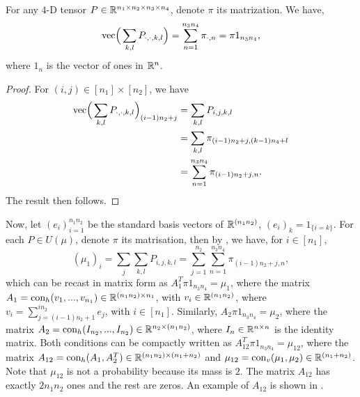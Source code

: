 \begin{lemma} \label{vec_mat}
  For any $4$-D tensor $P \in \mathbb R^{n_1 \times n_2 \times n_3 \times n_4}$,
  denote $\pi$ its matrization. We have,
  \begin{equation*}
    \text{vec} \Big( \sum_{k,l} P_{\cdot, \cdot, k, l} \Big) = \sum_{n=1}^{n_3 n_4} \pi_{\cdot, n} = \pi 1_{n_3 n_4},
  \end{equation*}
  where $1_n$ is the vector of ones in $\mathbb R^n$.
\end{lemma}
\begin{proof}
For $(i,j) \in [n_1] \times [n_2]$, we have
\begin{align*}
    \text{vec} \Big(\sum_{k,l} P_{\cdot,\cdot, k, l}\Big)_{(i-1)n_2 + j} &= \sum_{k,l} P_{i,j,k,l} \\
    &= \sum_{k,l} \pi_{(i-1) n_2 + j, (k-1) n_4 + l} \\
    &= \sum_{n=1}^{n_3 n_4} \pi_{(i-1) n_2 + j, n}.
\end{align*}
The result then follows.
\end{proof}
Now, let $(e_i)_{i=1}^{n_1 n_2}$ be the standard basis vectors of $\mathbb R^{(n_1 n_2)}$,
\ie $(e_i)_k = 1_{\{i=k\}}$. For each $P \in U(\mu)$, denote $\pi$ its matrisation,
then by , we have, for $i \in [n_1]$,
\begin{equation*}
  (\mu_1)_i = \sum_j \sum_{k,l} P_{i,j,k,l} = \sum_{j = 1}^{n_2} \sum_{n=1}^{n_3 n_4} \pi_{(i-1) n_2 + j, n},
\end{equation*}
which can be recast in matrix form as $A_1^T \pi 1_{n_3 n_4} = \mu_1$,
where the matrix $A_1 = \text{con}_{h}(v_1, ..., v_{n_1}) \in \mathbb R^{(n_1 n_2) \times n_1}$,
with $v_i \in \mathbb R^{(n_1 n_2)}$, where $v_i = \sum_{j=(i-1)n_2 + 1}^{i n_2} e_j$,
with $i \in [n_1]$. Similarly, $A_2 \pi 1_{n_3 n_4} = \mu_2$, where the matrix
$A_2 = \text{con}_h(I_{n_2}, ..., I_{n_2}) \in \mathbb R^{n_2 \times (n_1 n_2)}$,
where $I_n \in \mathbb R^{n \times n}$ is the identity matrix.
Both conditions can be compactly written as $A_{12}^T \pi 1_{n_3 n_4} = \mu_{12}$,
where the matrix $A_{12} = \text{con}_h(A_1, A_2^T) \in \mathbb R^{(n_1 n_2) \times (n_1+n_2)}$ and
$\mu_{12} = \text{con}_v(\mu_1, \mu_2) \in \mathbb R^{(n_1 + n_2)}$.
Note that $\mu_{12}$ is not a probability because its mass is $2$.
The matrix $A_{12}$ has exactly $2n_1n_2$ ones and the rest are zeros.
An example of $A_{12}$ is shown in .

